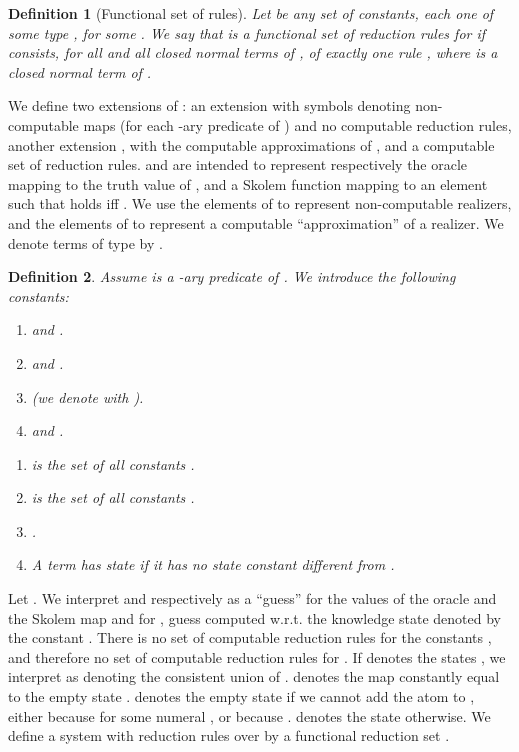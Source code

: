 \documentclass[copyright,creativecommons]{eptcs}
\newtheorem{definition}{Definition}
\begin{document}
\begin{definition}[Functional set of rules]\label{definition-functional}
Let  be any set of constants, each one of some type , for some . We say that  is a {\em functional set of reduction rules} for  if  consists, for all  and all closed normal terms  of , of exactly one rule , where  is a closed normal term of .
\end{definition}
We define two extensions of : an extension  with symbols denoting non-computable maps  (for each -ary predicate  of ) and no computable reduction rules, another extension , with the computable approximations  of , and a computable set of reduction rules.  and  are intended to represent respectively the oracle mapping  to the truth value of ,  and a Skolem function mapping  to an element  such that  holds iff .  We use the elements of  to represent non-computable realizers, and the elements of  to represent a computable ``approximation'' of a realizer. We denote terms of type  by .




\begin{definition} \label{definition-TermLanguageL1}
Assume  is a -ary predicate of . We introduce the following constants:
\begin{enumerate}

\item

and
.

\item
 and .

\item
 (we denote  with ). 

\item
 and .

\end{enumerate}
\begin{enumerate}
\item
 is the set of all constants .

\item
 is the set of all constants .

\item
.

\item
A term  has state  if it has no state constant different from .
\end{enumerate}
\end{definition}
Let . We interpret  and  respectively as a ``guess'' for the values of the oracle and the Skolem map  and  for , guess computed w.r.t. the knowledge state denoted by the constant .  There is no set of computable reduction rules for the constants , and therefore no set of computable reduction rules for . If  denotes the states , we  interpret  as denoting the consistent union  of .  denotes the map constantly equal to the empty state .  denotes the empty state  if we cannot add the atom  to , either because  for some numeral , or because .  denotes the state  otherwise. We define a system  with reduction rules over  by a functional reduction set .
\end{document}
